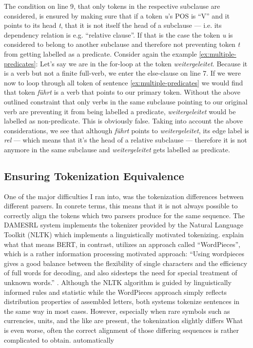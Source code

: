 The condition on line 9, that only tokens in the respective subclause are considered, is
ensured by making sure that if a token \textit{u}'s POS is ``V'' and it points to its head
\textit{t}, that it is not itself the head of a subclause --- i.e. its dependency relation
is e.g. ``relative clause''. If that is the case the token \textit{u} is considered to
belong to another subclause and therefore not preventing token \textit{t} from getting
labelled as a predicate. Consider again the example \ref{ex:multiple-predicates}: Let's say
we are in the for-loop at the token \textit{weitergeleitet}. Because it is a verb but not
a finite full-verb, we enter the else-clause on line 7. If we were now to loop through all
token of sentence \ref{ex:multiple-predicates} we would find that token \textit{führt} is a
verb that points to our primary token. Without the above outlined constraint that only verbs
in the same subclause pointing to our original verb are preventing it from being labelled
a predicate, \textit{weitergeleitet} would be labelled as non-predicate. This is obviously
false. Taking into account the above considerations, we see that although \textit{führt}
points to \textit{weitergeleitet}, its edge label is \textit{rel} --- which means that it's
the head of a relative subclause --- therefore it is not anymore in the same subclause and
\textit{weitergeleitet} gets labelled as predicate.

\subsection{Ensuring Tokenization Equivalence}

One of the major difficulties I ran into, was the tokenization differences between different
parsers. In conrete terms, this means that it is not always possible to correctly align the tokens
which two parsers produce for the same sequence. %
The DAMESRL system implements the tokenizer provided by the Natural Language
Toolkit (NLTK) which implements a linguistically motivated
tokenizing. {\color{red} explain what that means}
BERT, in contrast, utilizes an approach called ``WordPieces'', which is a rather information
processing motivated approach: ``Using wordpieces gives a good balance between the flexibility
of single characters and the efficiency of full words for decoding, and also sidesteps the need
for special treatment of unknown words.'' \citep[p.~2]{wu2016google}.
Although the NLTK algorithm is guided by linguistically informed rules and statistic while the
WordPieces approach simply reflects distribution properties of assembled letters, both systems
tokenize sentences in the same way in most cases. However, especially when rare symbols such as
currencies, units, and the like are present, the tokenization slightly differs What is even
worse, often the correct alignment of those differing sequences is rather complicated to obtain.
{\color{red} automatically}


